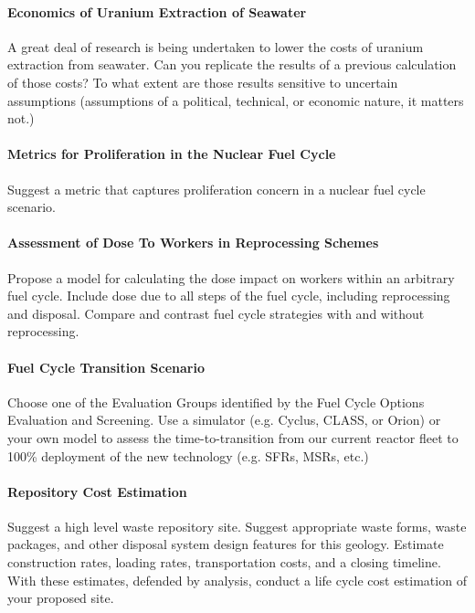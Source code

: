 \documentclass[12pts, answers]{exam}
\begin{document}
\paragraph{Economics of Uranium Extraction of Seawater} A great deal of
research is being undertaken to lower the costs of uranium extraction from
seawater. Can you replicate the results of a previous calculation of those
costs? To what extent are those results sensitive to uncertain assumptions
(assumptions of a political, technical, or economic nature, it matters not.)

\paragraph{Metrics for Proliferation in the Nuclear Fuel Cycle} Suggest a
metric that captures proliferation concern in a nuclear fuel cycle scenario.

\paragraph{Assessment of Dose To Workers in Reprocessing Schemes} Propose a model for
calculating the dose impact on workers within an arbitrary fuel cycle. Include
dose due to all steps of the fuel cycle, including reprocessing and disposal.
Compare and contrast fuel cycle strategies with and without reprocessing.

\paragraph{Fuel Cycle Transition Scenario} Choose one of the Evaluation Groups
identified by the Fuel Cycle Options Evaluation and Screening. Use a simulator
(e.g. Cyclus, CLASS, or Orion) or your own model to assess the
time-to-transition from our current reactor fleet to 100\% deployment of the
new technology (e.g. SFRs, MSRs, etc.)

\paragraph{Repository Cost Estimation} Suggest a high level waste repository
site. Suggest appropriate waste forms, waste packages, and other disposal
system design features for this geology. Estimate construction rates, loading
rates, transportation costs, and a closing timeline. With these estimates,
defended by analysis, conduct a life cycle cost estimation of your proposed
site.

%
%
\end{document}
